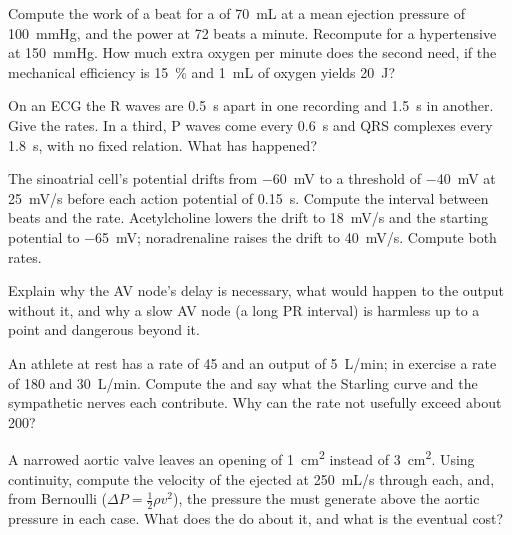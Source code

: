 \begin{exercise}[$\star\star$]\label{exo:b2:heart:6}
Compute the work of a beat for a  of \qty{70}{mL} at a
mean ejection pressure of \qty{100}{mmHg}, and the power at 72 beats
a minute. Recompute for a hypertensive at \qty{150}{mmHg}. How
much extra oxygen per minute does the second  need, if the
mechanical efficiency is \qty{15}{\%} and \qty{1}{mL} of oxygen
yields \qty{20}{J}?
\end{exercise}

\begin{exercise}[$\star\star$]\label{exo:b2:heart:7}
On an ECG the R waves are \qty{0.5}{s} apart in one recording and
\qty{1.5}{s} in another. Give the  rates. In a third, P waves
come every \qty{0.6}{s} and QRS complexes every \qty{1.8}{s}, with no
fixed relation. What has happened?
\end{exercise}

\begin{exercise}[$\star\star$]\label{exo:b2:heart:8}
The sinoatrial cell's potential drifts from \qty{-60}{mV} to a
threshold of \qty{-40}{mV} at \qty{25}{mV/s} before each action
potential of \qty{0.15}{s}. Compute the interval between beats and
the rate. Acetylcholine lowers the drift to \qty{18}{mV/s} and the
starting potential to \qty{-65}{mV}; noradrenaline raises the drift
to \qty{40}{mV/s}. Compute both rates.
\end{exercise}

\begin{exercise}[$\star\star$]\label{exo:b2:heart:9}
Explain why the AV node's delay is necessary, what would happen to
the output without it, and why a slow AV node (a long PR interval)
is harmless up to a point and dangerous beyond it.
\end{exercise}

\begin{exercise}[$\star\star\star$]\label{exo:b2:heart:10}
An athlete at rest has a rate of 45 and an output of \qty{5}{L/min};
in exercise a rate of 180 and \qty{30}{L/min}. Compute the  and say what the Starling curve and the sympathetic nerves
each contribute. Why can the rate not usefully exceed about 200?
\end{exercise}

\begin{exercise}[$\star\star\star$]\label{exo:b2:heart:11}
A narrowed aortic valve leaves an opening of \qty{1}{cm^2} instead
of \qty{3}{cm^2}. Using continuity, compute the velocity of the
ejected  at \qty{250}{mL/s} through each, and, from Bernoulli
($\Delta P = \tfrac12\rho v^2$), the pressure the  must
generate above the aortic pressure in each case. What does the
 do about it, and what is the eventual cost?
\end{exercise}

